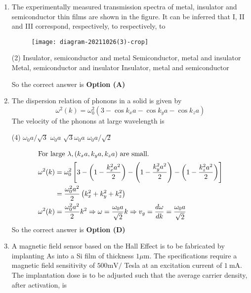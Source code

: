 \begin{enumerate}
	\item The experimentally measured transmission spectra of metal, insulator and semiconductor thin films are shown in the figure. It can be inferred that I, II and III correspond, respectively, to
	respectively, to
	{}
	\begin{figure}[H]
		\centering
		\texttt{[image: diagram-20211026(3)-crop]}
	\end{figure}
	\begin{tasks}(2)
		\task[\textbf{A.}]  Insulator, semiconductor and metal
		\task[\textbf{B.}]  Semiconductor, metal and insulator
		\task[\textbf{C.}] Metal, semiconductor and insulator
		\task[\textbf{D.}] Insulator, metal and semiconductor
	\end{tasks}
	\begin{answer}
		So the correct answer is \textbf{Option (A)}
	\end{answer}
	\item The dispersion relation of phonons in a solid is given by
	$$
	\omega^{2}(k)=\omega_{0}^{2}\left(3-\cos k_{x} a-\cos k_{y} a-\cos k_{z} a\right)
	$$
	The velocity of the phonons at large wavelength is
	{}
	\begin{tasks}(4)
		\task[\textbf{A.}] $\omega_{0} a / \sqrt{3}$
		\task[\textbf{B.}] $\omega_{0} a$
		\task[\textbf{C.}] $\sqrt{3} \omega_{0} a$
		\task[\textbf{D.}] $\omega_{0} a / \sqrt{2}$
	\end{tasks}
	\begin{answer}
		\begin{align*}
		\intertext{For large $\lambda,\left(k_{x} a, k_{y} a, k_{z} a\right)$ are small.}
		\omega^{2}(k)&=\omega_{0}^{2}\left[3-\left(1-\frac{k_{x}^{2} a^{2}}{2}\right)-\left(1-\frac{k_{y}^{2} a^{2}}{2}\right)-\left(1-\frac{k_{z}^{2} a^{2}}{2}\right)\right]\\&=\frac{\omega_{0}^{2} a^{2}}{2}\left(k_{x}^{2}+k_{y}^{2}+k_{z}^{2}\right)\\
		\omega^{2}(k)&=\frac{\omega_{0}^{2} a^{2}}{2} k^{2} \Rightarrow \omega=\frac{\omega_{0} a}{\sqrt{2}} k \Rightarrow v_{g}=\frac{d \omega}{d k}=\frac{\omega_{0} a}{\sqrt{2}}
		\end{align*}
		So the correct answer is \textbf{Option (D)}
	\end{answer}
	\item A magnetic field sensor based on the Hall Effect is to be fabricated by implanting As into a Si film of thickness $1 \mu \mathrm{m}$. The specifications require a magnetic field sensitivity of $500 \mathrm{mV} /$ Tesla at an excitation current of $1 \mathrm{~mA}$. The implantation dose is to be adjusted such that the average carrier density, after activation, is

\end{enumerate}
